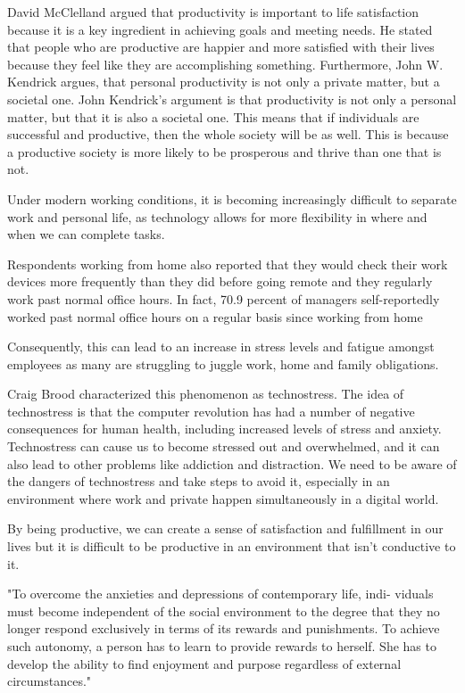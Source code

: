 
David McClelland argued that productivity is important to life satisfaction
because it is a key ingredient in achieving goals and meeting needs.
He stated that people who are productive are happier and more satisfied with their lives
because they feel like they are accomplishing something.\cite[p.~159]{McClelland1961}
Furthermore, John W. Kendrick argues,
that personal productivity is not only a private matter, but a societal one.
John Kendrick's argument is that productivity is not only a personal matter, but that it is also a societal one.
This means that if individuals are successful and productive, then the whole society will be as well.
This is because a productive society is more likely to be prosperous and thrive than one that is not.
\cite{Kendrick1987May}


Under modern working conditions, it is becoming increasingly difficult to separate work and personal life,
as technology allows for more flexibility in where and when we can complete tasks.



Respondents working from home also reported that they would check their work devices
more frequently than they did before going remote
and they regularly work past normal office hours. In fact,
70.9 percent of managers self-reportedly worked past normal office hours
on a regular basis since working from home

Consequently, this can lead to an increase in stress levels and fatigue
amongst employees as many are struggling to juggle work,
home and family obligations.


Craig Brood characterized this phenomenon as technostress.
The idea of technostress is that the computer revolution has had
a number of negative consequences for human health,
including increased levels of stress and anxiety.
Technostress can cause us to become stressed out and overwhelmed,
and it can also lead to other problems like addiction and distraction.
We need to be aware of the dangers of technostress and take steps to avoid it,
especially in an environment where work and private happen simultaneously in a digital world.

By being productive, we can
create a sense of satisfaction and fulfillment in our lives \cite{Csikzentmihalyi1990}
but it is difficult to be productive in an environment
that isn't conductive to it.


"To overcome the anxieties and depressions of contemporary life, indi-
viduals must become independent of the social environment to the degree
that they no longer respond exclusively
in terms of its rewards and punishments.
To achieve such autonomy, a person has to learn to provide rewards
to herself. She has to develop the ability to find enjoyment and purpose
regardless of external circumstances."\cite[p.16]{Csikzentmihalyi1990}

